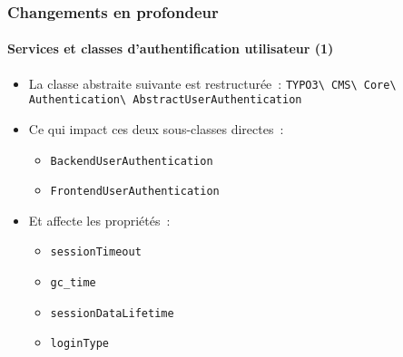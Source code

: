 
\begin{frame}[fragile]
	\frametitle{Changements en profondeur}
	\framesubtitle{Services et classes d'authentification utilisateur (1)}

	\begin{itemize}
		\item La classe abstraite suivante est restructurée~:\newline
			\small\texttt{TYPO3\textbackslash
				CMS\textbackslash
				Core\textbackslash
				Authentication\textbackslash
				AbstractUserAuthentication}\normalsize
		\item Ce qui impact ces deux sous-classes directes~:

			\begin{itemize}
				\item \texttt{BackendUserAuthentication}
				\item \texttt{FrontendUserAuthentication}
			\end{itemize}

		\item Et affecte les propriétés~:

			\begin{itemize}
				\item \texttt{sessionTimeout}
				\item \texttt{gc\_time}
				\item \texttt{sessionDataLifetime}
				\item \texttt{loginType}
			\end{itemize}

	\end{itemize}

\end{frame}


